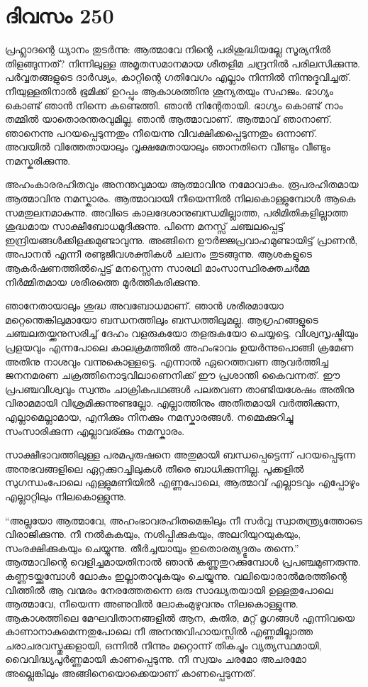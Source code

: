 \section{ദിവസം 250}


പ്രഹ്ലാദന്റെ ധ്യാനം തുടര്‍ന്നു: ആത്മാവേ നിന്റെ പരിശുദ്ധിയല്ലേ സൂര്യനില്‍ തിളങ്ങുന്നത്? നിന്നിലുള്ള അമൃതസമാനമായ ശീതളിമ ചന്ദ്രനില്‍ പരിലസിക്കുന്നു. പര്‍വ്വതങ്ങളുടെ ദാര്‍ഢ്യം, കാറ്റിന്റെ ഗതിവേഗം എല്ലാം നിന്നില്‍ നിന്നുദ്ഭവിച്ചത്. നീയുള്ളതിനാല്‍ ഭൂമിക്ക് ഉറപ്പും ആകാശത്തിനു ശൂന്യതയും സഹജം. ഭാഗ്യം കൊണ്ട് ഞാന്‍ നിന്നെ കണ്ടെത്തി. ഞാന്‍ നിന്റേതായി. ഭാഗ്യം കൊണ്ട് നാം തമ്മില്‍ യാതൊരന്തരവുമില്ല. ഞാന്‍ ആത്മാവാണ്. ആത്മാവ് ഞാനാണ്. ഞാനെന്നു പറയപ്പെടുന്നതും നീയെന്നു വിവക്ഷിക്കപ്പെടുന്നതും ഒന്നാണ്. അവയില്‍  വിത്തേതായാലും വൃക്ഷമേതായാലും ഞാനതിനെ വീണ്ടും വീണ്ടും നമസ്കരിക്കുന്നു.
     
അഹംകാരരഹിതവും അനന്തവുമായ ആത്മാവിനു നമോവാകം. രൂപരഹിതമായ ആത്മാവിനു നമസ്കാരം. ആത്മാവായി നീയെന്നില്‍ നിലകൊള്ളുമ്പോള്‍ ആകെ സമതുലനമാകുന്നു. അവിടെ കാലദേശാനുബന്ധമില്ലാത്ത, പരിമിതികളില്ലാത്ത ശുദ്ധമായ സാക്ഷീബോധമുദിക്കുന്നു. പിന്നെ മനസ്സ് ചഞ്ചലപ്പെട്ട് ഇന്ദ്രിയങ്ങള്‍ക്കിളക്കമുണ്ടാവുന്നു. അങ്ങിനെ ഊര്‍ജ്ജപ്രവാഹമുണ്ടായിട്ട്  പ്രാണന്‍, അപാനന്‍ എന്നീ രണ്ടുജീവശക്തികള്‍ ചലനം തുടങ്ങുന്നു. ആശകളുടെ ആകര്‍ഷണത്തില്‍പ്പെട്ട് മനസ്സെന്ന സാരഥി മാംസാസ്ഥിരക്തചര്‍മ്മ നിര്‍മ്മിതമായ ശരീരത്തെ മൂര്‍ത്തീകരിക്കുന്നു.
    
ഞാനേതായാലും ശുദ്ധ അവബോധമാണ്. ഞാന്‍ ശരീരമായോ മറ്റെന്തെങ്കിലുമായോ ബന്ധനത്തിലും ബന്ധത്തിലുമല്ല. ആഗ്രഹങ്ങളുടെ ചഞ്ചലതയ്ക്കനുസരിച്ച് ദേഹം വളരുകയോ തളരുകയോ ചെയ്യട്ടെ. വിശ്വസൃഷ്ടിയും പ്രളയവും എന്നപോലെ കാലക്രമത്തില്‍ അഹംഭാവം ഉയര്‍ന്നുപൊങ്ങി ക്രമേണ അതിനു നാശവും വന്നുകൊള്ളട്ടെ. എന്നാല്‍ ഏറെത്തവണ ആവര്‍ത്തിച്ച ജനനമരണ ചക്രത്തിനൊടുവിലാണെനിക്ക് ഈ പ്രശാന്തി കൈവന്നത്. ഈ പ്രപഞ്ചവിശ്വവും സ്വന്തം ചാക്രികപഥങ്ങള്‍ പലതവണ താണ്ടിയശേഷം അതിനു വിരാമമായി വിശ്രമിക്കുന്നുണ്ടല്ലോ. എല്ലാത്തിനും  അതീതമായി വര്‍ത്തിക്കുന്ന, എല്ലാമെല്ലാമായ, എനിക്കും നിനക്കും നമസ്കാരങ്ങള്‍. നമ്മെക്കുറിച്ചു സംസാരിക്കുന്ന എല്ലാവര്ക്കും നമസ്കാരം.

സാക്ഷീഭാവത്തിലുള്ള പരമപുരുഷനെ അതുമായി ബന്ധപ്പെട്ടെന്ന് പറയപ്പെടുന്ന  അനുഭവങ്ങളിലെ ഏറ്റക്കുറച്ചിലുകള്‍ തീരെ ബാധിക്കുന്നില്ല. പൂക്കളില്‍ സുഗന്ധംപോലെ എള്ളുമണിയില്‍ എണ്ണപോലെ, ആത്മാവ് എല്ലാടവും എപ്പോഴും എല്ലാറ്റിലും നിലകൊള്ളുന്നു.

“അല്ലയോ ആത്മാവേ, അഹംഭാവരഹിതമെങ്കിലും നീ സര്‍വ്വ സ്വാതന്ത്ര്യത്തോടെ വിരാജിക്കുന്നു. നീ നല്‍കുകയും, നശിപ്പിക്കുകയും, അലറിയുറയുകയും, സംരക്ഷിക്കുകയും ചെയ്യുന്നു. തീര്‍ച്ചയായും ഇതൊരത്യദ്ഭുതം തന്നെ.” ആത്മാവിന്റെ വെളിച്ചമായതിനാല്‍ ഞാന്‍ കണ്ണുതുറക്കുമ്പോള്‍ പ്രപഞ്ചമുണരുന്നു. കണ്ണടയ്ക്കുമ്പോള്‍ ലോകം ഇല്ലാതാവുകയും ചെയ്യുന്നു. വലിയൊരാല്‍മരത്തിന്റെ വിത്തില്‍ ആ വന്മരം നേരത്തേതന്നെ ഒരു സാദ്ധ്യതയായി ഉള്ളതുപോലെ   ആത്മാവേ, നീയെന്ന അണുവില്‍ ലോകംമുഴുവനും നിലകൊള്ളുന്നു. ആകാശത്തിലെ മേഘവിതാനങ്ങളില്‍ ആന, കുതിര, മറ്റ് മൃഗങ്ങള്‍ എന്നിവയെ കാണാനാകുമെന്നതുപോലെ നീ അനന്തവിഹായസ്സില്‍ എണ്ണമില്ലാത്ത ചരാചരവസ്തുക്കളായി, ഒന്നില്‍ നിന്നും മറ്റൊന്ന് തികച്ചും വ്യത്യസ്ഥമായി, വൈവിദ്ധ്യപൂര്‍ണ്ണമായി  കാണപ്പെടുന്നു. നീ സ്വയം ചരമോ അചരമോ അല്ലെങ്കിലും അങ്ങിനെയൊക്കെയാണ് കാണപ്പെടുന്നത്.
